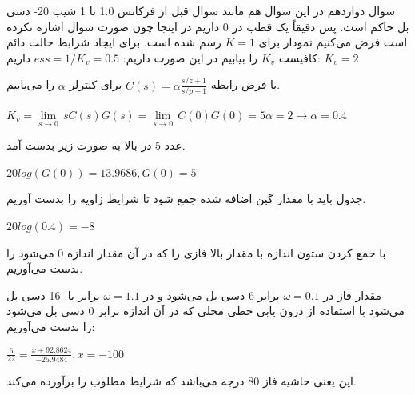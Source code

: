 \documentclass{article}
\begin{document}
\begin{problem}{سوال دوازدهم}
	در این سوال هم مانند سوال قبل از فرکانس 1.0 تا 1 شیب 20- دسی بل حاکم است. پس دقیقاً یک قطب در  0 داریم در اینجا چون صورت سوال اشاره نکرده است فرض می‌کنیم نمودار برای 
	$K = 1$
	رسم شده است. برای ایجاد شرابط حالت دائم کافیست 
	$K_v$
	را بیابیم در این صورت داریم:
	$ess = 1/K_v = 0.5$
	داریم:
	$K_v = 2$
	
	با فرض رابطه $C(s)=\alpha\frac{s/z+1}{s/p+1}$ برای کنترلر 
	$\alpha$
	را می‌یابیم.
	
	\raggedleft
	${{K}_{v}}=\underset{s\to 0}{\mathop{\lim }}\,sC(s)G(s)=\underset{s\to 0}{\mathop{\lim }}\,C(0)G(0)=5\alpha =2\to \alpha =0.4$
	
	\raggedright
	عدد 5 در بالا به صورت زیر بدست آمد.
	
	\raggedleft
	$20log(G(0)) = 13.9686, G(0) = 5$
	
	\raggedright
	جدول باید با مقدار گین اضافه شده جمع شود تا شرایط زاویه را بدست آوریم.
	
	\raggedleft
	$20log(0.4) = -8$
	
	\raggedright
	با حمع کردن ستون اندازه با مقدار بالا فازی را که در آن مقدار اندازه 0 می‌شود را بدست می‌آوریم.
	
	مقدار فاز در 
	$\omega = 0.1$
	برابر 6 دسی بل می‌شود و در
	$\omega = 1.1$
	برابر با -16 دسی بل می‌شود با استفاده از درون یابی خطی محلی که در آن اندازه برابر 0 دسی بل می‌شود را بدست می‌آوریم:
	
	\raggedleft
	$\frac{6}{22} = \frac{x+92.8624}{-25.9484} , x = -100$
	
	\raggedright 
	 این یعنی حاشیه فاز 80 درجه می‌باشد که شرایط مطلوب را برآورده می‌کند.
	
\end{problem}
\end{document}
